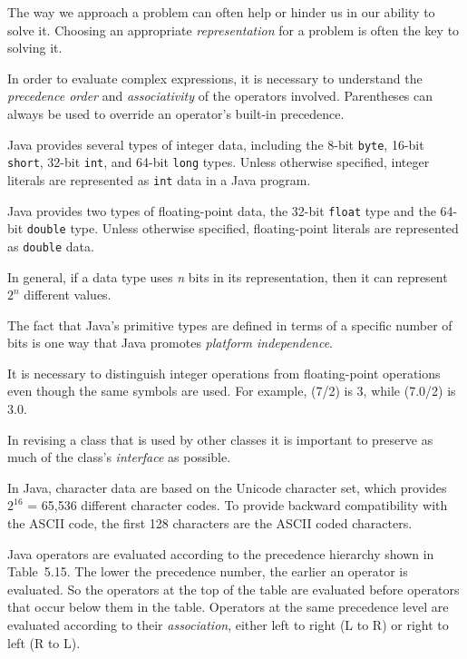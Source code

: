 \label{summaryof-important-points}
\begin{SMBL}
\item  The way we approach a problem can often help
or hinder us in our ability to solve it. Choosing an appropriate {\it
representation} for a problem is often the key to solving it.

\item  In order to evaluate complex expressions, it is necessary to
understand the {\it precedence order} and {\it associativity} of the
operators involved. Parentheses can always be used to override an
operator's built-in precedence.

\item  Java provides several types of integer data, including the
8-bit {\tt byte}, 16-bit {\tt short}, 32-bit {\tt int}, and 64-bit
{\tt long} types. Unless otherwise specified, integer literals are
represented as {\tt int} data in a Java program.

\item  Java provides two types of floating-point data, the 32-bit
{\tt float} type and the 64-bit {\tt double} type. Unless otherwise
specified, floating-point literals are represented as {\tt double}
data.

\item  In general, if a data type uses {\it n} bits in its representation,
then it can represent $2^n$ different values.

\item  The fact that Java's primitive types are defined in terms
of a specific number of bits is one way that Java promotes {\it
platform independence}.

\item  It is necessary to distinguish integer operations from
floating-point operations even though the same symbols are used.
For example, (7/2) is 3, while (7.0/2) is 3.0.

\item  In revising a class
that is used by other classes it is important to preserve as much of
the class's {\it interface} as possible.

\item  In Java, character data are based on the Unicode character set,
which provides $2^{16}$ = 65,536 different character codes. To provide
backward compatibility with the ASCII code, the first 128 characters
are the ASCII coded characters.

\item Java operators are evaluated according to the precedence hierarchy
shown in Table~5.15. The lower the precedence
number, the earlier an operator is evaluated. So the operators at the
top of the table are evaluated before operators that occur below them
in the table.  Operators at the same precedence level are evaluated
according to their {\it association}, either left to right (L to R)
or right to left (R to L).


\end{SMBL}
